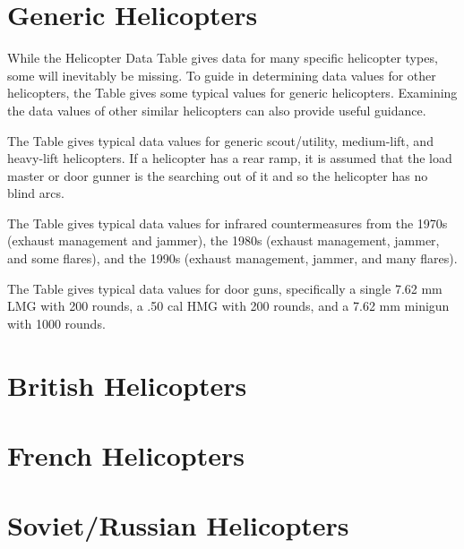 \documentclass{report}
\begin{document}
\section{Generic Helicopters}

While the Helicopter Data Table gives data for many specific helicopter types, some will inevitably be missing. To guide in determining data values for other helicopters, the Table gives some typical values for generic helicopters. Examining the data values of other similar helicopters can also provide useful guidance.

The Table gives typical data values for generic scout/utility, medium-lift, and heavy-lift helicopters. If a helicopter has a rear ramp, it is assumed that the load master or door gunner is the searching out of it and so the helicopter has no blind arcs.

The Table gives typical data values for infrared countermeasures from the 1970s (exhaust management and jammer), the 1980s (exhaust management, jammer, and some flares), and the 1990s (exhaust management, jammer, and many flares).

The Table gives typical data values for door guns, specifically a single 7.62 mm LMG with 200 rounds, a .50 cal HMG with 200 rounds, and a 7.62 mm minigun with 1000 rounds.


\section{British Helicopters}








\section{French Helicopters}






\section{Soviet/Russian Helicopters}




\end{document}
